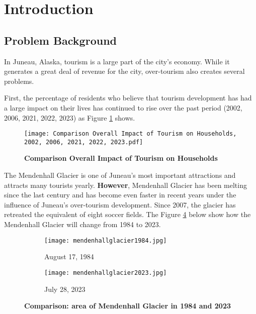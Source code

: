 \documentclass{mcmthesis}
\begin{document}
\section{Introduction}
\subsection{Problem Background}
{In Juneau, Alaska, tourism is a large part of the city's economy. While it generates a great deal of revenue for the city, over-tourism also creates several problems.}

{First, the percentage of residents who believe that tourism development has had a large impact on their lives has continued to rise over the past period (2002, 2006, 2021, 2022, 2023) as Figure \ref{fig:Figure1} shows.\cite{1}}

\begin{figure}[h]
  \small
  \centering
  \texttt{[image: Comparison Overall Impact of Tourism on Households, 2002, 2006, 2021, 2022, 2023.pdf]}
  \caption{\textbf{Comparison Overall Impact of Tourism on Households}} \label{fig:Figure1}
\end{figure}

{The Mendenhall Glacier is one of Juneau's most important attractions and attracts many tourists yearly. \textbf{However}, Mendenhall Glacier has been melting since the last century and has become even faster in recent years under the influence of Juneau's over-tourism development. Since 2007, the glacier has retreated the equivalent of eight soccer fields. The Figure \ref{fig:Figure2} below show how the Mendenhall Glacier will change from 1984 to 2023.\cite{2}\cite{3}}

\begin{figure}[htbp]
  \centering
  \begin{subfigure}[b]{0.49\textwidth}
      \texttt{[image: mendenhallglacier1984.jpg]}
      \caption{August 17, 1984}
      \label{fig:first_image}
  \end{subfigure}
  \hfill
  \begin{subfigure}[b]{0.49\textwidth}
      \texttt{[image: mendenhallglacier2023.jpg]}
      \caption{July 28, 2023}
      \label{fig:second_image}
  \end{subfigure}
  \caption{\textbf{Comparison: area of Mendenhall Glacier in 1984 and 2023}}
  \label{fig:Figure2}
\end{figure}
\end{document}
